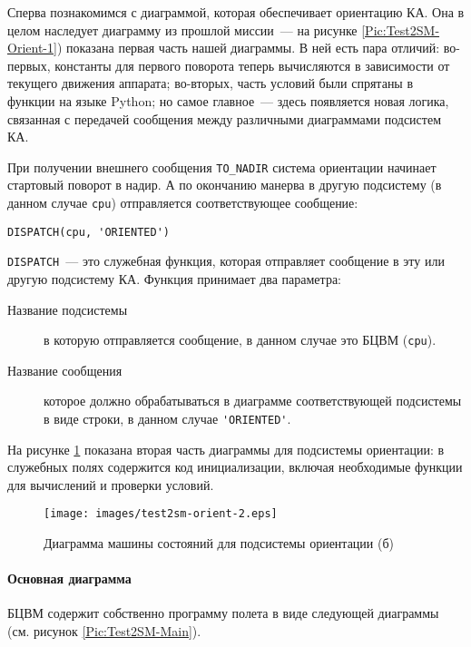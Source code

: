 \documentclass[12pt,a4paper]{article}
\begin{document}
Сперва познакомимся с диаграммой, которая обеспечивает ориентацию КА. Она в целом
наследует диаграмму из прошлой миссии~--- на рисунке \ref{Pic:Test2SM-Orient-1}) показана
первая часть нашей диаграммы. В ней есть пара отличий: во-первых, константы для первого
поворота теперь вычисляются в зависимости от текущего движения аппарата; во-вторых, часть
условий были спрятаны в функции на языке Python; но самое главное~--- здесь появляется
новая логика, связанная с передачей сообщения между различными диаграммами подсистем КА.

При получении внешнего сообщения \verb'TO_NADIR' система ориентации начинает стартовый
поворот в надир. А по окончанию манерва в другую подсистему (в данном случае \verb'cpu')
отправляется соответствующее сообщение:

\begin{center}
\begin{verbatim}
DISPATCH(cpu, 'ORIENTED')
\end{verbatim}
\end{center}

\verb'DISPATCH'~--- это служебная функция, которая отправляет сообщение в эту или другую
подсистему КА. Функция принимает два параметра:

\begin{description}
\item[Название подсистемы] в которую отправляется сообщение, в данном случае это БЦВМ
  (\verb'cpu').
\item[Название сообщения] которое должно обрабатываться в диаграмме соответствующей
  подсистемы в виде строки, в данном случае \verb"'ORIENTED'".
\end{description}

На рисунке \ref{Pic:Test2SM-Orient-2} показана вторая часть диаграммы для подсистемы
ориентации: в служебных полях содержится код инициализации, включая необходимые функции
для вычислений и проверки условий. 

\begin{figure}[tbh]
  \begin{center}
    \texttt{[image: images/test2sm-orient-2.eps]}
    \caption{Диаграмма машины состояний для подсистемы ориентации (б)}
    \label{Pic:Test2SM-Orient-2}
  \end{center}
\end{figure}

\paragraph{Основная диаграмма} БЦВМ содержит собственно программу полета в виде следующей
диаграммы (см. рисунок \ref{Pic:Test2SM-Main}).
\end{document}
